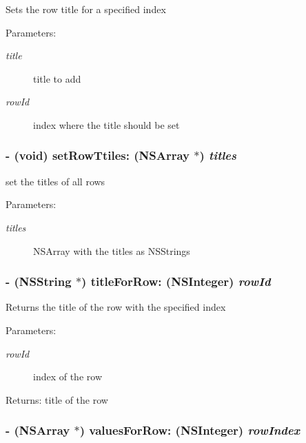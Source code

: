 Sets the row title for a specified index \begin{Desc}
\item[Parameters:]
\begin{description}
\item[{\em title}]title to add \item[{\em rowId}]index where the title should be set \end{description}
\end{Desc}
\hypertarget{interface_t_p_chart_basic_a60b292eef70dacf23030a75f4fd0dd8}{
\subsubsection[{setRowTtiles:}]{\setlength{\rightskip}{0pt plus 5cm}- (void) setRowTtiles: (NSArray $\ast$) {\em titles}}}
\label{interface_t_p_chart_basic_a60b292eef70dacf23030a75f4fd0dd8}


set the titles of all rows \begin{Desc}
\item[Parameters:]
\begin{description}
\item[{\em titles}]NSArray with the titles as NSStrings \end{description}
\end{Desc}
\hypertarget{interface_t_p_chart_basic_29c20cc728ebf4bca74d1cc0acc51841}{
\subsubsection[{titleForRow:}]{\setlength{\rightskip}{0pt plus 5cm}- (NSString $\ast$) titleForRow: (NSInteger) {\em rowId}}}
\label{interface_t_p_chart_basic_29c20cc728ebf4bca74d1cc0acc51841}


Returns the title of the row with the specified index \begin{Desc}
\item[Parameters:]
\begin{description}
\item[{\em rowId}]index of the row \end{description}
\end{Desc}
\begin{Desc}
\item[Returns:]title of the row \end{Desc}
\hypertarget{interface_t_p_chart_basic_55444751da9bebff034548c8a8c9c05a}{
\subsubsection[{valuesForRow:}]{\setlength{\rightskip}{0pt plus 5cm}- (NSArray $\ast$) valuesForRow: (NSInteger) {\em rowIndex}}}
\label{interface_t_p_chart_basic_55444751da9bebff034548c8a8c9c05a}


